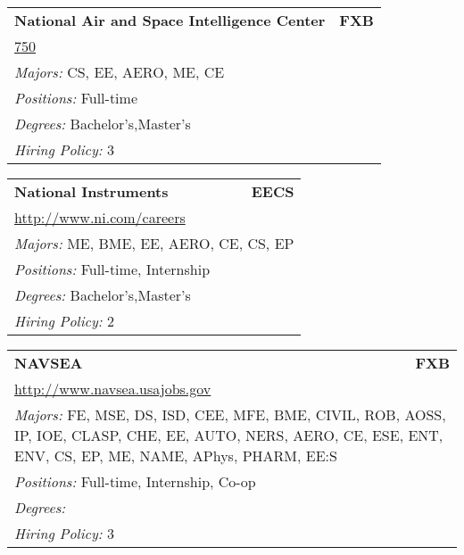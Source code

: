 \documentclass[twoside]{article}
\begin{document}
\begin{center}
\begin{multicols}{3}
\begin{FlushLeft}
\begin{minipage}{\columnwidth}
\end{minipage}
 
\begin{minipage}{\columnwidth}\begin{tabularx}{.95\columnwidth}{Xr}
                 {\Large\bf National Air and Space Intelligence Center} & {\Large\bf FXB}\\
    \multicolumn{2}{p{.95\columnwidth}}{\url{750}}\\
    \multicolumn{2}{p{.95\columnwidth}}{\emph{Majors:} CS, EE, AERO, ME, CE}\\
    \multicolumn{2}{p{.95\columnwidth}}{\emph{Positions:} Full-time}\\
    \multicolumn{2}{p{.95\columnwidth}}{\emph{Degrees:} Bachelor's,Master's}\\
    \multicolumn{2}{p{.95\columnwidth}}{\emph{Hiring Policy:} 3}\\
    \end{tabularx}
    
\end{minipage}
 
\begin{minipage}{\columnwidth}\begin{tabularx}{.95\columnwidth}{Xr}
                 {\Large\bf National Instruments} & {\Large\bf EECS}\\
    \multicolumn{2}{p{.95\columnwidth}}{\url{http://www.ni.com/careers}}\\
    \multicolumn{2}{p{.95\columnwidth}}{\emph{Majors:} ME, BME, EE, AERO, CE, CS, EP}\\
    \multicolumn{2}{p{.95\columnwidth}}{\emph{Positions:} Full-time, Internship}\\
    \multicolumn{2}{p{.95\columnwidth}}{\emph{Degrees:} Bachelor's,Master's}\\
    \multicolumn{2}{p{.95\columnwidth}}{\emph{Hiring Policy:} 2}\\
    \end{tabularx}
    
\end{minipage}
 
\begin{minipage}{\columnwidth}\begin{tabularx}{.95\columnwidth}{Xr}
                 {\Large\bf NAVSEA} & {\Large\bf FXB}\\
    \multicolumn{2}{p{.95\columnwidth}}{\url{http://www.navsea.usajobs.gov}}\\
    \multicolumn{2}{p{.95\columnwidth}}{\emph{Majors:} FE, MSE, DS, ISD, CEE, MFE, BME, CIVIL, ROB, AOSS, IP, IOE, CLASP, CHE, EE, AUTO, NERS, AERO, CE, ESE, ENT, ENV, CS, EP, ME, NAME, APhys, PHARM, EE:S}\\
    \multicolumn{2}{p{.95\columnwidth}}{\emph{Positions:} Full-time, Internship, Co-op}\\
    \multicolumn{2}{p{.95\columnwidth}}{\emph{Degrees:} }\\
    \multicolumn{2}{p{.95\columnwidth}}{\emph{Hiring Policy:} 3}\\
    \end{tabularx}
    

\end{minipage}
\end{FlushLeft}
\end{multicols}
\end{center}
\end{document}
